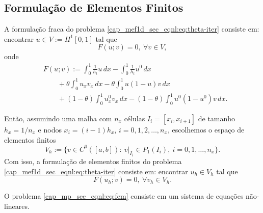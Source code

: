 \subsection{Formulação de Elementos Finitos}

A formulação fraca do problema \eqref{cap_mef1d_sec_eqnl:eq:theta-iter} consiste em: encontrar $u\in V := H^1[0,1]$ tal que
\begin{equation}
  F(u;v) = 0, ~\forall v\in V,
\end{equation}
onde
\begin{equation}
  \begin{aligned}
    & F(u; v) := \int_0^1 \frac{1}{h_t}u\,dx - \int_0^1 \frac{1}{h_t}u^0\,dx\\
    &\qquad + \theta\int_0^1 u_xv_x\,dx - \theta\int_0^1 u(1-u)v\,dx\\
    &\qquad + (1-\theta)\int_0^1 u^0_x v_x\,dx - (1-\theta)\int_0^1 u^0(1-u^0)v\,dx.
  \end{aligned}
\end{equation}

Então, assumindo uma malha com $n_x$ células $I_i = [x_i, x_{i+1}]$ de tamanho $h_x = 1/n_x$ e nodos $x_i = (i-1)h_x$, $i = 0, 1, 2, \dotsc, n_x$, escolhemos o espaço de elementos finitos
\begin{equation}
  V_h := \{v\in C^0([a,b]): ~v|_{I_i}\in P_1(I_i), ~i=0,1,\dotsc,n_x\}.
\end{equation}
Com isso, a formulação de elementos finitos do problema \eqref{cap_mef1d_sec_eqnl:eq:theta-iter} consiste em: encontrar $u_h\in V_h$ tal que
\begin{equation}\label{cap_mp_sec_eqnl:eq:fem}
  F(u_h; v) = 0, ~\forall v_h\in V_h.
\end{equation}

\begin{obs}
  O problema \eqref{cap_mp_sec_eqnl:eq:fem} consiste em um sistema de equações não-lineares.
\end{obs}

